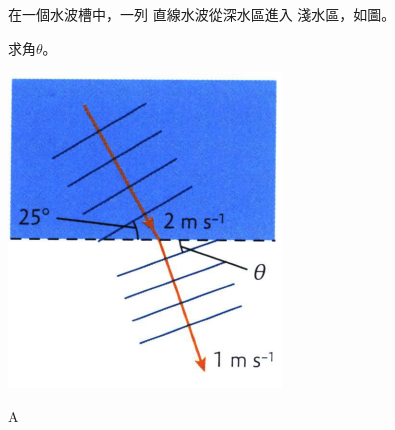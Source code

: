 {
    在一個水波槽中，一列 直線水波從深水區進入 淺水區，如圖。 \par 求角$\theta$。
    \par{\par\centering\includegraphics[width=.25\textwidth]{./img/ch2_earlyclass_wave_mc_2024-05-13-20-55-27.png}\par}
    \begin{tasks}
        \task {}
        \task {}
        \task {}
        \task {}
    \end{tasks}
}{\mckey A}

